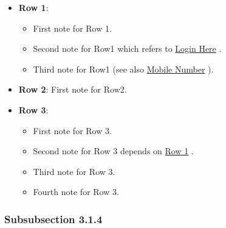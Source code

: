 \documentclass{article}%
\begin{document}
{\footnotesize%
\begin{itemize}%
\item%
\textbf{Row 1}: %
\begin{itemize}%
\item%
First note for Row 1.%
\item%
Second note for Row1 which refers to %
\hyperlink{ID:1580478443}{Login Here}%
\xspace%
.%
\item%
Third note for Row1 (see also %
\hyperlink{ID:1429610052}{Mobile Number}%
\xspace%
).%
\end{itemize}%
\item%
\textbf{Row 2}: %
First note for Row2.%
\item%
\textbf{Row 3}: %
\begin{itemize}%
\item%
First note for Row 3.%
\item%
Second note for Row 3 depends on %
\hyperlink{ID:678039943}{Row 1}%
\xspace%
.%
\item%
Third note for Row 3.%
\item%
Fourth note for Row 3.%
\end{itemize}%
\end{itemize}%
}%
\hypertarget{ID:770066387}{}%
\subsubsection{Subsubsection 3.1.4}%
\end{document}
